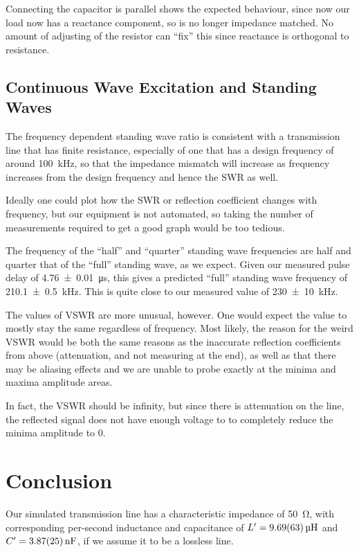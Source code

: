 \documentclass[a4paper]{scrartcl}
\begin{document}
Connecting the capacitor is parallel shows the expected behaviour, since now our load now has a reactance component, so is no longer impedance matched. No amount of adjusting of the resistor can ``fix'' this since reactance is orthogonal to resistance.

\subsection{Continuous Wave Excitation and Standing Waves}
The frequency dependent standing wave ratio is consistent with a transmission line that has finite resistance, especially of one that has a design frequency of around \SI{100}{\kilo\hertz}, so that the impedance mismatch will increase as frequency increases from the design frequency and hence the SWR as well.

Ideally one could plot how the SWR or reflection coefficient changes with frequency, but our equipment is not automated, so taking the number of measurements required to get a good graph would be too tedious.

The frequency of the ``half'' and ``quarter'' standing wave frequencies are half and quarter that of the ``full'' standing wave, as we expect. Given our measured pulse delay of \SI{4.76 \pm 0.01}{\micro\second}, this gives a predicted ``full'' standing wave frequency of \SI{210.1 \pm 0.5}{\kilo\hertz}. This is quite close to our measured value of \SI{230 \pm 10}{\kilo\hertz}.

The values of VSWR are more unusual, however. One would expect the value to mostly stay the same regardless of frequency. Most likely, the reason for the weird VSWR would be both the same reasons as the inaccurate reflection coefficients from above (attenuation, and not measuring at the end), as well as that there may be aliasing effects and we are unable to probe exactly at the minima and maxima amplitude areas.

In fact, the VSWR should be infinity, but since there is attenuation on the line, the reflected signal does not have enough voltage to to completely reduce the minima amplitude to 0.

\section{Conclusion}
Our simulated transmission line has a characteristic impedance of \SI{50}{\ohm}, with corresponding per-second inductance and capacitance of \(L' = \SI{9.69 \pm 0.63}{\micro\henry}\) and \(C' = \SI{3.87 \pm 0.25}{\nano\farad}\), if we assume it to be a lossless line.
\end{document}

